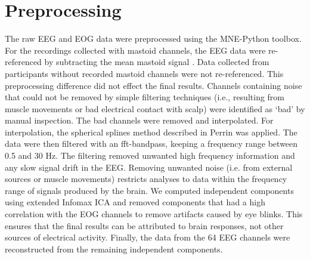 \section{Preprocessing}
The raw EEG and EOG data were preprocessed using the MNE-Python toolbox. 
For the recordings collected with mastoid channels, the EEG data were re-referenced by subtracting the mean mastoid signal \cite{teplan_fundamentals_2002}.
Data collected from participants without recorded mastoid channels were not re-referenced. 
This preprocessing difference did not effect the final results.
Channels containing noise that could not be removed by simple filtering techniques (i.e., resulting from muscle movements or bad electrical contact with scalp) were identified as `bad' by manual inspection.
The bad channels were removed and interpolated.
For interpolation, the spherical splines method described in Perrin \etal \citeyear{perrin_spherical_1989} was applied.
The data were then filtered with an fft-bandpass, keeping a frequency range between 0.5 and 30 Hz.
The filtering removed unwanted high frequency information and any slow signal drift in the EEG.
Removing unwanted noise (i.e. from external sources or muscle movements) restricts analyses to data within the frequency range of signals produced by the brain. 
We computed independent components using extended Infomax \ac{ICA} \cite{lee_independent_1999} and removed components that had a high correlation with the EOG channels to remove artifacts caused by eye blinks.
This ensures that the final results can be attributed to brain responses, not other sources of electrical activity.
Finally, the data from the 64 EEG channels were reconstructed from the remaining independent components.